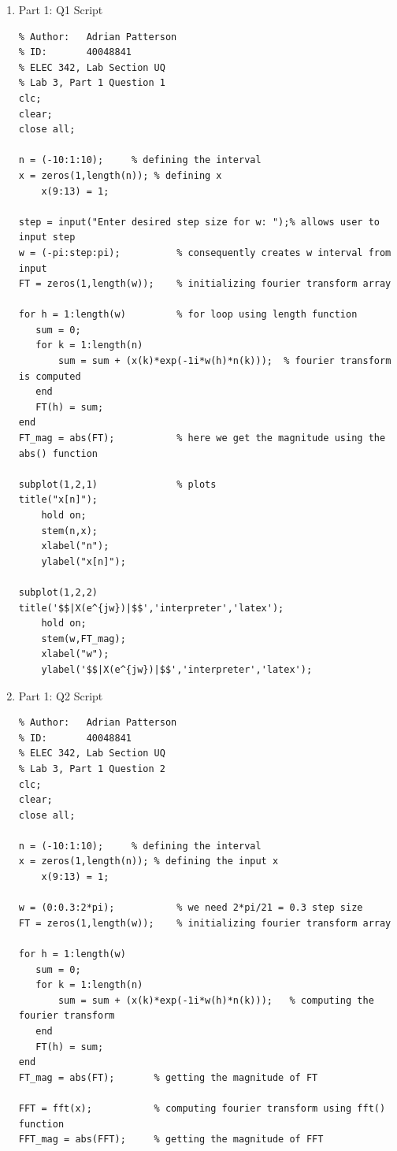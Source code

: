 \documentclass{article}
\begin{document}
\begin{enumerate}
    \item Part 1: Q1 Script
        \begin{verbatim}
% Author:   Adrian Patterson
% ID:       40048841
% ELEC 342, Lab Section UQ
% Lab 3, Part 1 Question 1
clc;
clear;
close all;

n = (-10:1:10);     % defining the interval
x = zeros(1,length(n)); % defining x
    x(9:13) = 1;

step = input("Enter desired step size for w: ");% allows user to input step
w = (-pi:step:pi);          % consequently creates w interval from input
FT = zeros(1,length(w));    % initializing fourier transform array 

for h = 1:length(w)         % for loop using length function
   sum = 0;
   for k = 1:length(n)
       sum = sum + (x(k)*exp(-1i*w(h)*n(k)));  % fourier transform is computed     
   end
   FT(h) = sum;
end
FT_mag = abs(FT);           % here we get the magnitude using the abs() function
    
subplot(1,2,1)              % plots
title("x[n]");
    hold on;
    stem(n,x);
    xlabel("n");
    ylabel("x[n]");

subplot(1,2,2)
title('$$|X(e^{jw})|$$','interpreter','latex');
    hold on;
    stem(w,FT_mag);
    xlabel("w");
    ylabel('$$|X(e^{jw})|$$','interpreter','latex');
        \end{verbatim}
        \vspace{.5cm}
        
    \item Part 1: Q2 Script
        \begin{verbatim}
% Author:   Adrian Patterson
% ID:       40048841
% ELEC 342, Lab Section UQ
% Lab 3, Part 1 Question 2
clc;
clear;
close all;

n = (-10:1:10);     % defining the interval
x = zeros(1,length(n)); % defining the input x
    x(9:13) = 1;

w = (0:0.3:2*pi);           % we need 2*pi/21 = 0.3 step size
FT = zeros(1,length(w));    % initializing fourier transform array

for h = 1:length(w)
   sum = 0;
   for k = 1:length(n)
       sum = sum + (x(k)*exp(-1i*w(h)*n(k)));   % computing the fourier transform
   end
   FT(h) = sum;
end
FT_mag = abs(FT);       % getting the magnitude of FT

FFT = fft(x);           % computing fourier transform using fft() function
FFT_mag = abs(FFT);     % getting the magnitude of FFT


\end{verbatim}
\end{enumerate}
\end{document}
